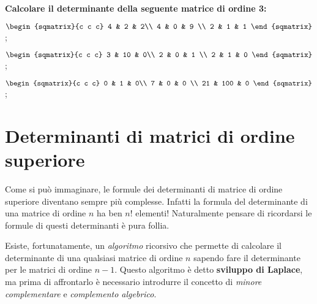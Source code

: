 \begin{exer}
    \textbf{Calcolare il determinante della seguente matrice di ordine 3:}
    
    $
        \begin{sqmatrix}{c c c}
            4 & 2 & 2\\
            4 & 0 & 9 \\
            2 & 1 & 1
        \end{sqmatrix}
    $;

    $
        \begin{sqmatrix}{c c c}
            3 & 10 & 0\\
            2 & 0 & 1 \\
            2 & 1 & 0
        \end{sqmatrix}
    $;

    $
        \begin{sqmatrix}{c c c}
            0 & 1 & 0\\
            7 & 0 & 0 \\
            21 & 100 & 0
        \end{sqmatrix}
    $;
\end{exer}

\section{Determinanti di matrici di ordine superiore}
Come si può immaginare, le formule dei determinanti di matrice di ordine superiore diventano sempre più complesse. Infatti la formula del determinante di una matrice di ordine $n$ ha ben $n!$ elementi! Naturalmente pensare di ricordarsi le formule di questi determinanti è pura follia.

Esiste, fortunatamente, un \textit{algoritmo} ricorsivo che permette di calcolare il determinante di una qualsiasi matrice di ordine $n$ sapendo fare il determinante per le matrici di ordine $n - 1$. Questo algoritmo è detto \textbf{sviluppo di Laplace}, ma prima di affrontarlo è necessario introdurre il concetto di \textit{minore complementare} e \textit{complemento algebrico}.

